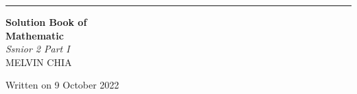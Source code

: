 \documentclass{report}
\begin{document}
\begin{titlepage}
    \raggedleft{}
    \rule{1pt}{\textheight}
    \hspace{0.02\textwidth}
    \parbox[b]{0.75\textwidth}{

    {\Huge\bfseries Solution Book of \\[0.5\baselineskip] Mathematic}\\[2\baselineskip]
    {\large\textit{Ssnior 2 Part I}}\\[4\baselineskip]
    {\Large\textsc{MELVIN CHIA}}

    \vspace{0.5\textheight}

    {\noindent Written on 9 October 2022}\\[\baselineskip]
    }

\end{titlepage}

\doublespacing{}
\tableofcontents
\singlespacing{}
\newpage
\end{document}
